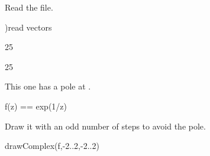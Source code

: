 \begin{xtc}
\begin{xtccomment}
Read the file.
\end{xtccomment}
\begin{spadsrc}
)read vectors 
\end{spadsrc}
\begin{TeXOutput}
\begin{fricasmath}{1}
%
\end{fricasmath}
\end{TeXOutput}
\begin{TeXOutput}
\begin{fricasmath}{2}
%
\end{fricasmath}
\end{TeXOutput}
\begin{TeXOutput}
\begin{fricasmath}{4}
%
\end{fricasmath}
\end{TeXOutput}
\begin{TeXOutput}
\begin{fricasmath}{6}
25%
\end{fricasmath}
\end{TeXOutput}
\begin{TeXOutput}
\begin{fricasmath}{7}
25%
\end{fricasmath}
\end{TeXOutput}
\begin{TeXOutput}
\begin{fricasmath}{8}
%
\end{fricasmath}
\end{TeXOutput}
\begin{TeXOutput}
\begin{fricasmath}{9}
%
\end{fricasmath}
\end{TeXOutput}
\end{xtc}
\begin{xtc}
\begin{xtccomment}
This one has a pole at .
\end{xtccomment}
\begin{spadsrc}
f(z) == exp(1/z)
\end{spadsrc}
\end{xtc}
\begin{psXtc}
\begin{xtccomment}
Draw it with an odd number of steps to avoid the pole.
\end{xtccomment}
\begin{spadsrc}
drawComplex(f,-2..2,-2..2)
\end{spadsrc}
\end{psXtc}
\

